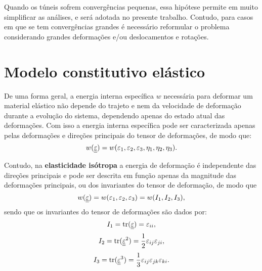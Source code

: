 Quando os túneis sofrem convergências pequenas, essa hipótese permite em muito simplificar as análises, e será adotada no presente trabalho. Contudo, para casos em que se tem convergências grandes é necessário reformular o problema considerando grandes deformações e/ou deslocamentos e rotações.

\section{Modelo constitutivo elástico}

De uma forma geral, a energia interna específica $w$  necessária para deformar um material elástico não depende do trajeto e nem da velocidade de deformação durante a evolução do sistema, dependendo apenas do estado atual das deformações. Com isso a energia interna específica pode ser caracterizada apenas pelas deformações e direções principais do tensor de deformações, de modo que:
\begin{equation}
	\label{eq:energia_interna_elastica}
	w(\underline{\underline \varepsilon}) = w(\varepsilon_1,\varepsilon_2,\varepsilon_3,\eta_1,\eta_2,\eta_3).
\end{equation}

Contudo, na \textbf{elasticidade isótropa} a energia de deformação é independente das direções principais e pode ser descrita em função apenas da magnitude das deformações principais, ou dos invariantes do tensor de deformação, de modo que
\begin{equation}
	\label{eq:energia_interna_elastica_isotropa}
	w(\underline{\underline \varepsilon}) = w(\varepsilon_1,\varepsilon_2,\varepsilon_3) = w(I_1,I_2,I_3),
\end{equation}
sendo que os invariantes do tensor de deformações são dados por:
\begin{equation}
	\label{eq:I1}
	I_1 = \text{tr}(\underline{\underline \varepsilon}) = \varepsilon_{ii},
\end{equation}
\begin{equation}
	\label{eq:I2}
	I_2 = \text{tr}(\underline{\underline \varepsilon}^2) = \frac{1}{2} \varepsilon_{ij} \varepsilon_{ji},
\end{equation}
\begin{equation}
	\label{eq:I3}
	I_3 = \text{tr}(\underline{\underline \varepsilon}^3) = \frac{1}{3} \varepsilon_{ij} \varepsilon_{jk} \varepsilon_{ki}.
\end{equation}

